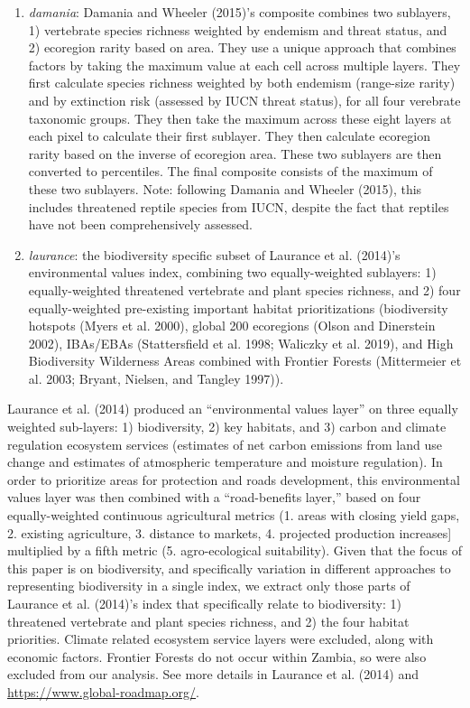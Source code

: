 \documentclass[
]{article}
\begin{document}
\begin{enumerate}
\def\labelenumi{(\arabic{enumi})}
\setcounter{enumi}{1}
\item
  \emph{damania}: Damania and Wheeler (2015)'s composite combines two sublayers, 1) vertebrate species richness weighted by endemism and threat status, and 2) ecoregion rarity based on area. They use a unique approach that combines factors by taking the maximum value at each cell across multiple layers. They first calculate species richness weighted by both endemism (range-size rarity) and by extinction risk (assessed by IUCN threat status), for all four verebrate taxonomic groups. They then take the maximum across these eight layers at each pixel to calculate their first sublayer. They then calculate ecoregion rarity based on the inverse of ecoregion area. These two sublayers are then converted to percentiles. The final composite consists of the maximum of these two sublayers. Note: following Damania and Wheeler (2015), this includes threatened reptile species from IUCN, despite the fact that reptiles have not been comprehensively assessed.
\item
  \emph{laurance}: the biodiversity specific subset of Laurance et al. (2014)'s environmental values index, combining two equally-weighted sublayers: 1) equally-weighted threatened vertebrate and plant species richness, and 2) four equally-weighted pre-existing important habitat prioritizations (biodiversity hotspots (Myers et al. 2000), global 200 ecoregions (Olson and Dinerstein 2002), IBAs/EBAs (Stattersfield et al. 1998; Waliczky et al. 2019), and High Biodiversity Wilderness Areas combined with Frontier Forests (Mittermeier et al. 2003; Bryant, Nielsen, and Tangley 1997)).
\end{enumerate}

Laurance et al. (2014) produced an ``environmental values layer'' on three equally weighted sub-layers: 1) biodiversity, 2) key habitats, and 3) carbon and climate regulation ecosystem services (estimates of net carbon emissions from land use change and estimates of atmospheric temperature and moisture regulation). In order to prioritize areas for protection and roads development, this environmental values layer was then combined with a ``road-benefits layer,'' based on four equally-weighted continuous agricultural metrics (1. areas with closing yield gaps, 2. existing agriculture, 3. distance to markets, 4. projected production increases{]} multiplied by a fifth metric (5. agro-ecological suitability). Given that the focus of this paper is on biodiversity, and specifically variation in different approaches to representing biodiversity in a single index, we extract only those parts of Laurance et al. (2014)'s index that specifically relate to biodiversity: 1) threatened vertebrate and plant species richness, and 2) the four habitat priorities. Climate related ecosystem service layers were excluded, along with economic factors. Frontier Forests do not occur within Zambia, so were also excluded from our analysis. See more details in Laurance et al. (2014) and \url{https://www.global-roadmap.org/}.
\end{document}
